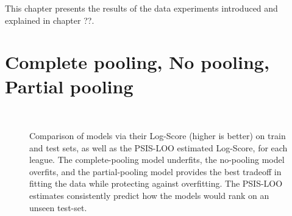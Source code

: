 This chapter presents the results of the data experiments introduced and explained in chapter ??.

\section{Complete pooling, No pooling, Partial pooling}

\begin{figure}
	 \\
	\caption{Comparison of models via their Log-Score (higher is better) on train and test sets, as well as the PSIS-LOO estimated Log-Score, for each league. The complete-pooling model underfits, the no-pooling model overfits, and the partial-pooling model provides the best tradeoff in fitting the data while protecting against overfitting. The PSIS-LOO estimates consistently predict how the models would rank on an unseen test-set.}
	\label{fig:log_scores}
\end{figure}

